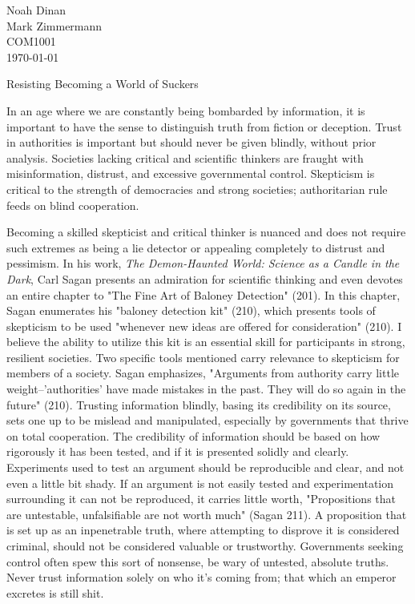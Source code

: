 \documentclass[12pt]{article}
\begin{document}
\newpage

\noindent
Noah Dinan \\ Mark Zimmermann \\ COM1001 \\ \today \\

\begin{center}
Resisting Becoming a World of Suckers
\end{center}

\setlength{\parindent}{0.5in}

In an age where we are constantly being bombarded by information, it is important to have the sense to distinguish truth from fiction or deception.
Trust in authorities is important but should never be given blindly, without prior analysis. Societies lacking critical and scientific thinkers
are fraught with misinformation, distrust, and excessive governmental control. Skepticism is critical to the strength of democracies and strong societies; 
authoritarian rule feeds on blind cooperation.

Becoming a skilled skepticist and critical thinker is nuanced and does not require such extremes as
being a lie detector or appealing completely to distrust and pessimism. In his work, \textit{The Demon-Haunted World: Science as a Candle in the Dark}, Carl Sagan 
presents an admiration for scientific thinking and even devotes an entire chapter to "The Fine Art of Baloney Detection" (201). In this chapter,
Sagan enumerates his "baloney detection kit" (210), which presents tools of skepticism to be used "whenever new ideas are offered for consideration" (210).
I believe the ability to utilize this kit is an essential skill for participants in strong, resilient societies. Two specific tools mentioned 
carry relevance to skepticism for members of a society. Sagan emphasizes, "Arguments from authority carry little weight–'authorities' 
have made mistakes in the past. They will do so again in the future" (210). Trusting information blindly, basing its credibility on its source,
sets one up to be mislead and manipulated, especially by governments that thrive on total cooperation. The credibility of information should be based on 
how rigorously it has been tested, and if it is presented solidly and clearly. Experiments used to test an argument should be reproducible and clear, and not
even a little bit shady. If an argument is not easily tested and experimentation surrounding it can not be reproduced, 
it carries little worth, "Propositions that are untestable, unfalsifiable are not worth much" (Sagan 211).
A proposition that is set up as an inpenetrable truth, where attempting to disprove it is considered criminal, should not be considered valuable or trustworthy.
Governments seeking control often spew this sort of nonsense, be wary of untested, absolute truths.
Never trust information solely on who it's coming from; that which an emperor excretes is still shit.
\end{document}
